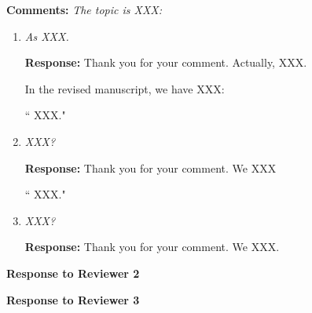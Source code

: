 \documentclass[12pt, onecolumn, final]{IEEEtran}
\newcommand{\blue}[1]{{{\color{blue} #1}}}
\theoremstyle{plain}\newtheorem{comment}{Comment}
\theoremstyle{definition}\newtheorem{response}{Response}
\begin{document}
\textbf{Comments:}
\textit{The topic is XXX:}
\begin{enumerate}
  \item \textit{As XXX.}

    \textbf{Response:}
      Thank you for your comment. Actually, XXX.

     In the revised manuscript, we have XXX: 
     
     ``\blue{XXX.}"
\\

\item \textit{XXX?}

\textbf{Response:}
      Thank you for your comment. We XXX

      ``\blue{XXX.}"
\\

\item \textit{XXX?}

\textbf{Response:}
      Thank you for your comment. We XXX.
\\

\end{enumerate}

\clearpage

\begin{center}
\huge \textbf{Response to Reviewer 2}
\end{center}



\newpage

\begin{center}
\huge \textbf{Response to Reviewer 3}
\end{center}
\end{document}
